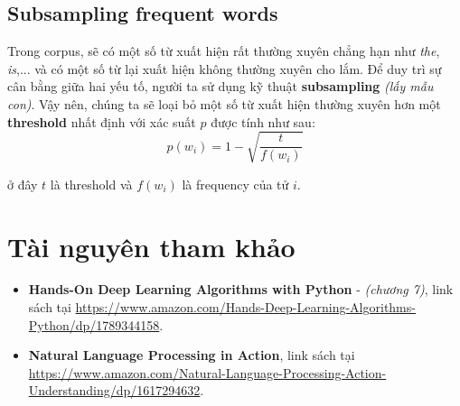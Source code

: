 \documentclass[12pt]{article}
\newcommand{\twiceIndent}{\hspace{\parindent}}
\begin{document}
\subsection{Subsampling frequent words}
Trong corpus, sẽ có một số từ xuất hiện rất thường xuyên chẳng hạn như \textsl{the}, \textsl{is},... và có một số từ lại xuất hiện không thường xuyên cho lắm. Để duy trì sự cân bằng giữa hai yếu tố, người ta sử dụng kỹ thuật \textbf{subsampling} \textit{(lấy mẫu con)}. Vậy nên, chúng ta sẽ loại bỏ một số từ xuất hiện thường xuyên hơn một \textbf{threshold} nhất định với xác suất $p$ được tính như sau:
$$p(w_i) = 1 - \sqrt{\dfrac{t}{f(w_i)}}$$

\twiceIndent ở đây $t$ là threshold và $f(w_i)$ là frequency của tử $i$.
\section{Tài nguyên tham khảo}
\begin{itemize}
  \item \textbf{\color{teal} Hands-On Deep Learning Algorithms with Python} - \textit{(chương 7)}, link sách tại \href{https://www.amazon.com/Hands-Deep-Learning-Algorithms-Python/dp/1789344158}{\color{blue} https://www.amazon.com/Hands-Deep-Learning-Algorithms-Python/dp/1789344158}.
  \item \textbf{\color{teal} Natural Language Processing in Action}, link sách tại \href{https://www.amazon.com/Natural-Language-Processing-Action-Understanding/dp/1617294632}{\color{blue} https://www.amazon.com/Natural-Language-Processing-Action-Understanding/dp/1617294632}. 
\end{itemize}
\end{document}
